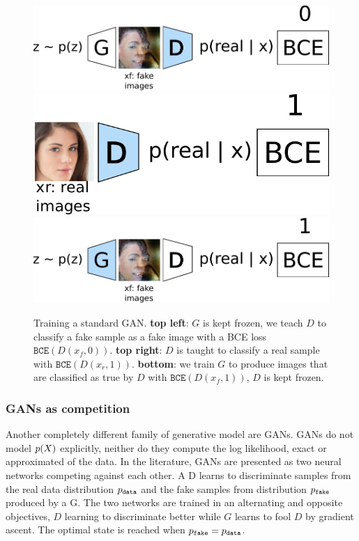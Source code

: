 \begin{figure}[ht]
    \centering
    \includegraphics[scale=0.5]{60-files/gan-learn-D-fake.pdf} \hspace{1cm}
    \includegraphics[scale=0.5]{60-files/gan-learn-D-real.pdf}
    \includegraphics[scale=0.5]{60-files/gan-learn-G.pdf}
    \caption{Training a standard \ac{GAN}. \textbf{top left}: $G$ is kept frozen, we teach $D$ to classify a fake sample as a fake image with a \ac{BCE} loss $\texttt{BCE}(D(x_f, 0))$. \textbf{top right}: $D$ is taught to classify a real sample with $\texttt{BCE}(D(x_r, 1))$. \textbf{bottom}: we train $G$ to produce images that are classified as true by $D$ with $\texttt{BCE}(D(x_f, 1))$, $D$ is kept frozen.}
    \label{fig:gan-training}
\end{figure}

\subsubsection{\acp{GAN} as competition}

Another completely different family of generative model are \acp{GAN}. \acp{GAN} do not model $p(X)$ explicitly, neither do they compute the log likelihood, exact or approximated of the data. In the literature, \acp{GAN} are presented as two neural networks competing against each other. A \ac{D} learns to discriminate samples from the real data distribution $p_\texttt{data}$ and the fake samples from distribution $p_\texttt{fake}$ produced by a \ac{G}. The two networks are trained in an alternating and opposite objectives, $D$ learning to discriminate better while $G$ learns to fool $D$ by gradient ascent. The optimal state is reached when $p_\texttt{fake} = p_\texttt{data}$.

